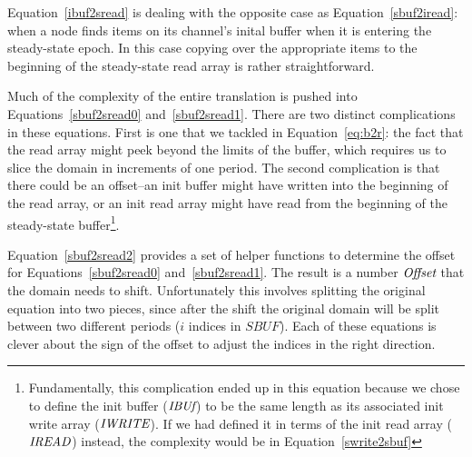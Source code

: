Equation~\ref{ibuf2sread} is dealing with the opposite case as
Equation~\ref{sbuf2iread}: when a node finds items on its channel's
inital buffer when it is entering the steady-state epoch.  In this
case copying over the appropriate items to the beginning of the
steady-state read array is rather straightforward.

Much of the complexity of the entire translation is pushed into
Equations~\ref{sbuf2sread0} and~\ref{sbuf2sread1}.  There are two
distinct complications in these equations.  First is one that we
tackled in Equation~\ref{eq:b2r}: the fact that the read array might
peek beyond the limits of the buffer, which requires us to slice the
domain in increments of one period.  The second complication is that
there could be an offset--an init buffer might have written into the
beginning of the read array, or an init read array might have read
from the beginning of the steady-state buffer\footnote{Fundamentally,
this complication ended up in this equation because we chose to define
the init buffer ($\mbox{\it IBUf}$) to be the same length as its associated
init write array ($\mbox{\it IWRITE}$).  If we had defined it in terms of
the init read array ($\mbox{\it IREAD}$) instead, the complexity would be in
Equation~\ref{swrite2sbuf}}.

Equation~\ref{sbuf2sread2} provides a set of helper functions to
determine the offset for Equations~\ref{sbuf2sread0}
and~\ref{sbuf2sread1}.  The result is a number $\mbox{\it Offset}$ that the
domain needs to shift.  Unfortunately this involves splitting the
original equation into two pieces, since after the shift the original
domain will be split between two different periods ($i$ indices in
$SBUF$).  Each of these equations is clever about the sign of the
offset to adjust the indices in the right direction.